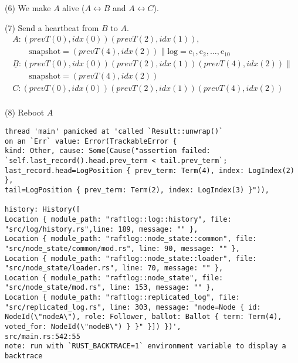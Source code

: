 \documentclass{article}
\newcommand{\term}[1]{\textit{prevT}(#1)}
\newcommand{\idx}[1]{\textit{idx}(#1)}
\begin{document}
(6) We make $A$ alive ($A \leftrightarrow B$ and $A \leftrightarrow C$).

(7) Send a heartbeat from $B$ to $A$.
\[
\begin{array}{l}
A: (\term{0}, \idx{0}) (\term{2}, \idx{1}), \\
\qquad \text{snapshot} = (\term{4}, \idx{2}) \| \text{log} = \text{c}_1, \text{c}_2, \ldots, \text{c}_{10} \\
\underline{B}: (\term{0}, \idx{0}) (\term{2}, \idx{1}) (\term{4}, \idx{2}) \| \\
\qquad \text{snapshot} = (\term{4}, \idx{2}) \\
C: (\term{0}, \idx{0}) (\term{2}, \idx{1}) (\term{4}, \idx{2}) \\
\end{array}
\]

(8) Reboot $A$
\begin{verbatim}
thread 'main' panicked at 'called `Result::unwrap()` 
on an `Err` value: Error(TrackableError {
kind: Other, cause: Some(Cause("assertion failed:
`self.last_record().head.prev_term < tail.prev_term`;
last_record.head=LogPosition { prev_term: Term(4), index: LogIndex(2) },
tail=LogPosition { prev_term: Term(2), index: LogIndex(3) }")),

history: History([
Location { module_path: "raftlog::log::history", file: "src/log/history.rs",line: 189, message: "" },
Location { module_path: "raftlog::node_state::common", file: "src/node_state/common/mod.rs", line: 90, message: "" },
Location { module_path: "raftlog::node_state::loader", file: "src/node_state/loader.rs", line: 70, message: "" },
Location { module_path: "raftlog::node_state", file: "src/node_state/mod.rs", line: 153, message: "" },
Location { module_path: "raftlog::replicated_log", file: "src/replicated_log.rs", line: 303, message: "node=Node { id: NodeId(\"nodeA\"), role: Follower, ballot: Ballot { term: Term(4), voted_for: NodeId(\"nodeB\") } }" }]) })',
src/main.rs:542:55
note: run with `RUST_BACKTRACE=1` environment variable to display a backtrace
\end{verbatim}
\end{document}
